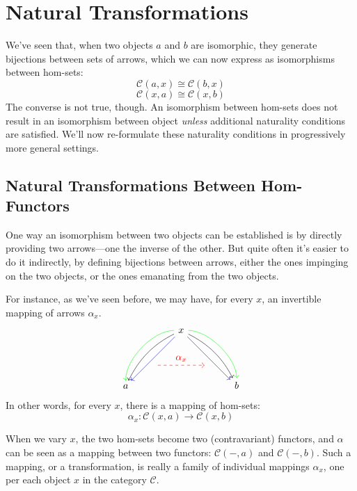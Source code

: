 \documentclass[DaoFP]{subfiles}
\begin{document}
\setcounter{chapter}{8}

\chapter{Natural Transformations}

We've seen that, when two objects $a$ and $b$ are isomorphic, they generate bijections between sets of arrows, which we can now express as isomorphisms between hom-sets:
\[\mathcal{C}(a, x) \cong \mathcal{C}(b, x)\]
\[\mathcal{C}(x, a) \cong \mathcal{C}(x, b)\]
The converse is not true, though. An isomorphism between hom-sets does not result in an isomorphism between object \emph{unless} additional naturality conditions are satisfied. We'll now re-formulate these naturality conditions in progressively more general settings.

\section{Natural Transformations Between Hom-Functors}

One way an isomorphism between two objects can be established is by directly providing two arrows---one the inverse of the other. But quite often it's easier to do it indirectly, by defining bijections between arrows, either the ones impinging on the two objects, or the ones emanating from the two objects. 

For instance, as we've seen before, we may have, for every $x$, an invertible mapping of arrows $\alpha_x$.
\[
 \begin{tikzcd}
 \node(x) at (0, 2) {x};
 \node(a) at (-2, 0) {a};
 \node(b) at (2, 0) {b};
 \node(c1) at (-1, 1.5) {};
 \node(c2) at (-1.5, 1) {};
 \node(c3) at (-1, 2) {};
 \node(c4) at (-2, 1) {};
 \node(d1) at (1, 1.5) {};
 \node(d2) at (1.5, 1) {};
 \node(d3) at (1, 2) {};
 \node(d4) at (2, 1) {};
\node (aa) at (-1, 0.75) {};
 \node (bb) at (1, 0.75) {};
 \draw[->] (x) .. controls (c1)  and (c2) .. (a); %
 \draw[->, green] (x) .. controls (c3)  and (c4) .. (a); %
 \draw[->, blue] (x) -- (a); 
  \draw[->] (x) .. controls (d1)  and (d2) .. (b); %
 \draw[->, green] (x) .. controls (d3)  and (d4) .. (b); %
 \draw[->, blue] (x) -- (b); 
 \draw[->, red, dashed] (aa) -- node[above]{\alpha_x} (bb);
 \end{tikzcd}
\]
In other words, for every $x$, there is a mapping of hom-sets:
\[ \alpha_x \colon \mathcal{C}(x, a) \to \mathcal{C}(x, b) \]

When we vary $x$, the two hom-sets become two (contravariant) functors, and $\alpha$ can be seen as a mapping between two functors:  $\mathcal{C}(-, a)$ and $\mathcal{C}(-, b)$. Such a mapping, or a transformation, is really a family of individual mappings $\alpha_x$, one per each object $x$ in the category $\mathcal{C}$. 
\end{document}
